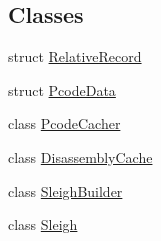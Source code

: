 \subsection*{Classes}
\begin{DoxyCompactItemize}
\item 
struct \mbox{\hyperlink{struct_relative_record}{Relative\+Record}}
\item 
struct \mbox{\hyperlink{struct_pcode_data}{Pcode\+Data}}
\item 
class \mbox{\hyperlink{class_pcode_cacher}{Pcode\+Cacher}}
\item 
class \mbox{\hyperlink{class_disassembly_cache}{Disassembly\+Cache}}
\item 
class \mbox{\hyperlink{class_sleigh_builder}{Sleigh\+Builder}}
\item 
class \mbox{\hyperlink{class_sleigh}{Sleigh}}
\end{DoxyCompactItemize}
